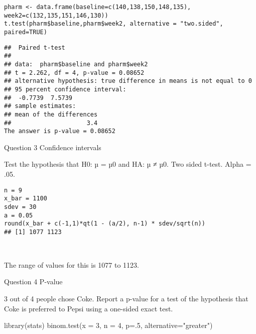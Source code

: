 \begin{frame}[fragile]
	
\begin{framed}
\begin{verbatim}
pharm <- data.frame(baseline=c(140,138,150,148,135), week2=c(132,135,151,146,130))
t.test(pharm$baseline,pharm$week2, alternative = "two.sided", paired=TRUE)
\end{verbatim}
\end{framed}

\end{frame}
\begin{frame}[fragile]
	
	\begin{framed}
		\begin{verbatim}
##  Paired t-test
## 
## data:  pharm$baseline and pharm$week2
## t = 2.262, df = 4, p-value = 0.08652
## alternative hypothesis: true difference in means is not equal to 0
## 95 percent confidence interval:
##  -0.7739  7.5739
## sample estimates:
## mean of the differences 
##                     3.4
The answer is p-value = 0.08652

\end{verbatim}
\end{framed}

\end{frame}
\begin{frame}[fragile]
Question 3 Confidence intervals

Test the hypothesis that H0: µ = µ0 and HA: µ ≠ µ0. Two sided t-test. Alpha = .05.

\begin{framed}
\begin{verbatim}
n = 9
x_bar = 1100
sdev = 30
a = 0.05
round(x_bar + c(-1,1)*qt(1 - (a/2), n-1) * sdev/sqrt(n))
## [1] 1077 1123



\end{verbatim}
\end{framed}
The range of values for this is 1077 to 1123.
\end{frame}
\begin{frame}[fragile]
Question 4 P-value

3 out of 4 people chose Coke. Report a p-value for a test of the hypothesis that Coke is preferred to Pepsi using a one-sided exact test.

library(stats)
binom.test(x = 3, n = 4, p=.5, alternative="greater")
\end{frame}
